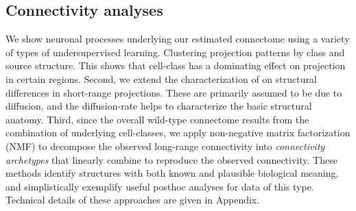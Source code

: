 

\newpage
\subsection{Connectivity analyses}

We show neuronal processes underlying our estimated connectome using a variety of types of undersupervised learning.
Clustering projection patterns by class and source structure.
This shows that cell-class has a dominating effect on projection in certain regions.
Second, we extend the characterization of \citet{Knox2019-ot} on structural differences in short-range projections.
These are primarily assumed to be due to diffusion, and the diffusion-rate helps to characterize the basic structural anatomy.
Third, since the overall wild-type connectome results from the combination of underlying cell-classes, we apply non-negative matrix factorization (NMF) to decompose the observed long-range connectivity into \textit{connectivity archetypes} that linearly combine to reproduce the observed connectivity.
These methods identify structures with both known and plausible biological meaning, and simplistically exemplify useful posthoc analyses for data of this type.
Technical details of these approaches are given in Appendix.



